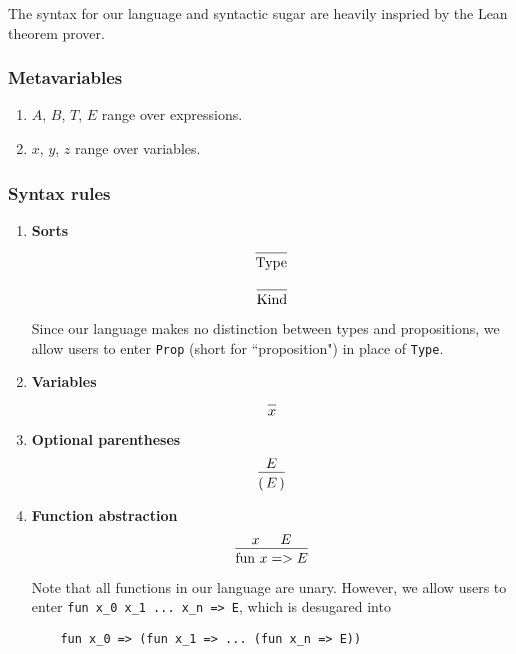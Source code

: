\documentclass{article}
\begin{document}
The syntax for our language and syntactic sugar are heavily inspried by the
Lean theorem prover.

\subsubsection{Metavariables}
\begin{enumerate}
  \item $A$, $B$, $T$, $E$ range over expressions. 
  \item $x$, $y$, $z$ range over variables.
\end{enumerate}

\subsubsection{Syntax rules}
\begin{enumerate}
\item \textbf{Sorts} \\
  \[
    \begin{prooftree}
      \infer0{\Type}
    \end{prooftree}
  \]

  \[
    \begin{prooftree}
      \infer0{\Kind}
    \end{prooftree}
  \]

  Since our language makes no distinction between types and propositions,
  we allow users to enter \verb|Prop| (short for ``proposition") in place of 
  \verb|Type|.

\item \textbf{Variables} \\
  \[
    \begin{prooftree}
      \infer0{x}
    \end{prooftree}
  \]

\item \textbf{Optional parentheses} \\
  \[
    \begin{prooftree}
      \hypo{E}
      \infer1{( \, E \, )}
    \end{prooftree}
  \]
  
\item \textbf{Function abstraction} \\
  \[
    \begin{prooftree}
      \hypo{x}
      \hypo{E}
      \infer2{\fun \, x => E}
    \end{prooftree}
  \]

  Note that all functions in our language are unary. However, we allow users
  to enter \verb|fun x_0 x_1 ... x_n => E|, which is desugared into
  \begin{verbatim}
    fun x_0 => (fun x_1 => ... (fun x_n => E))
  \end{verbatim}


\end{enumerate}
\end{document}
